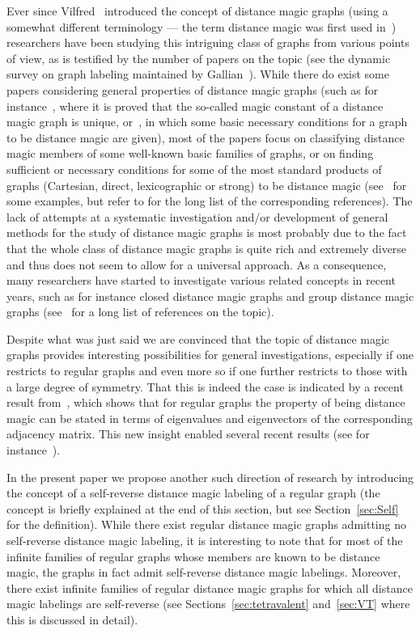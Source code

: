 \documentclass[11 pt,english]{article}
\theoremstyle{definition}
\begin{document}
Ever since Vilfred~\cite{Vil94} introduced the concept of distance magic graphs (using a somewhat different terminology --- the term distance magic was first used in~\cite{SugFroMilRyaWal09}) researchers have been studying this intriguing class of graphs from various points of view, as is testified by the number of papers on the topic (see the dynamic survey on graph labeling maintained by Gallian~\cite{GalD}). While there do exist some papers considering general properties of distance magic graphs (such as for instance~\cite{AruKamVij14, ONeSla27}, where it is proved that the so-called magic constant of a distance magic graph is unique, or~\cite{SugFroMilRyaWal09}, in which some basic necessary conditions for a graph to be distance magic are given), most of the papers focus on classifying distance magic members of some well-known basic families of graphs, or on finding sufficient or necessary conditions for some of the most standard products of graphs (Cartesian, direct, lexicographic or strong) to be distance magic (see~\cite{AnhCicPetTep15, CicFro16, CicFroKroRad16, GreKov13, MikSpa21, MikSpa24, TiaHouHouGao21} for some examples, but refer to \cite{GalD} for the long list of the corresponding references). The lack of attempts at a systematic investigation and/or development of general methods for the study of distance magic graphs is most probably due to the fact that the whole class of distance magic graphs is quite rich and extremely diverse and thus does not seem to allow for a universal approach. As a consequence, many researchers have started to investigate various related concepts in recent years, such as for instance closed distance magic graphs and group distance magic graphs (see~\cite{GalD} for a long list of references on the topic). 

Despite what was just said we are convinced that the topic of distance magic graphs provides interesting possibilities for general investigations, especially if one restricts to regular graphs and even more so if one further restricts to those with a large degree of symmetry. That this is indeed the case is indicated by a recent result from~\cite{MikSpa21}, which shows that for regular graphs the property of being distance magic can be stated in terms of eigenvalues and eigenvectors of the corresponding adjacency matrix. This new insight enabled several recent results (see for instance~\cite{FerMalMikRaz23, MikSpa21,MikSpa23, MikSpa24, RozSpa24}).

In the present paper we propose another such direction of research by introducing the concept of a self-reverse distance magic labeling of a regular graph (the concept is briefly explained at the end of this section, but see Section~\ref{sec:Self} for the definition). While there exist regular distance magic graphs admitting no self-reverse distance magic labeling, it is interesting to note that for most of the infinite families of regular graphs whose members are known to be distance magic, the graphs in fact admit self-reverse distance magic labelings. Moreover, there exist infinite families of regular distance magic graphs for which all distance magic labelings are self-reverse (see Sections~\ref{sec:tetravalent} and~\ref{sec:VT} where this is discussed in detail). 
\end{document}
